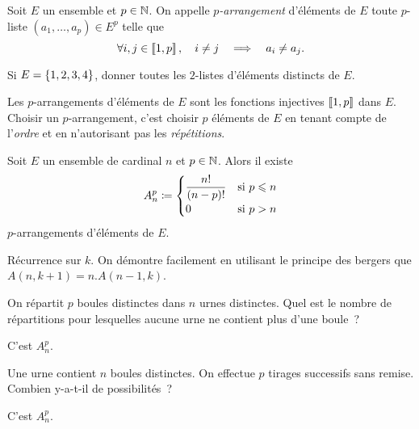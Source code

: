 \documentclass{magnolia}
\begin{document}
\begin{definition}[nom={$p$-arrangements}]
Soit $E$ un ensemble et $p \in \mathbb{N}$. On appelle \emph{$p$-arrangement} d'éléments de $E$
toute $p$-liste $(a_1,\dots,a_p)\in E^p$ telle que
\[\forall i,j\in\left\llbracket 1,p\right\rrbracket,\quad i\neq j\quad\Longrightarrow\quad a_i \neq a_j.\]
\end{definition}

\begin{exoUnique}
\exo Si $E=\left\{1,2,3,4\right\}$, donner toutes les $2$-listes d'éléments distincts de $E$.
\end{exoUnique}

\begin{remarques}
\remarque Les $p$-arrangements d'éléments de $E$ sont les fonctions injectives $\left\llbracket 1,p\right\rrbracket$ dans $E$.
\remarque Choisir un $p$-arrangement, c'est choisir $p$ éléments de $E$ en tenant
  compte de  l'\emph{ordre} et en n'autorisant pas les \emph{répétitions}.
\end{remarques}

\begin{proposition}[nom={Nombre d'arrangements}]
Soit $E$ un ensemble de cardinal $n$ et $p\in\mathbb{N}$. Alors il existe
\[A_n^p\coloneqq
  \begin{cases}
  \displaystyle\frac{n!}{\left(n-p\right)!} & \text{si $p\leqslant n$}\\
  0 & \text{si $p>n$}
  \end{cases}\]
  $p$-arrangements d'éléments de $E$.
\end{proposition}

\begin{preuve}
Récurrence sur $k$. On démontre facilement en utilisant le principe des bergers
que $A(n,k+1)=n.A(n-1,k)$.
\end{preuve}

\begin{exos}
\exo On répartit $p$ boules distinctes dans $n$ urnes distinctes. Quel est
  le nombre de répartitions pour lesquelles aucune urne ne contient plus d'une
  boule~?
  \begin{sol}
  C'est $A_n^p$.
  \end{sol}
\exo Une urne contient $n$ boules distinctes. On effectue $p$ tirages
  successifs sans remise. Combien y-a-t-il de possibilités~?
  \begin{sol}
  C'est $A_n^p$.
  \end{sol}
\end{exos}
\end{document}
